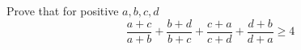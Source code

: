 Prove that for positive $a,b,c,d$\[\frac{a+c}{a+b}+\frac{b+d}{b+c}+\frac{c+a}{c+d}+\frac{d+b}{d+a}\ge 4\]